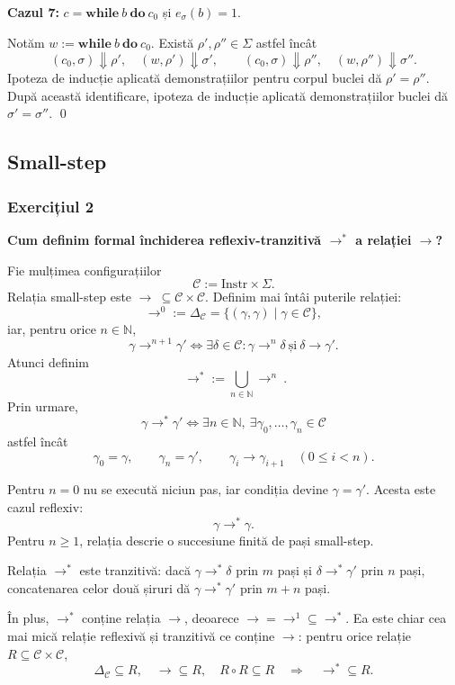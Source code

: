 \textbf{Cazul 7:} $c=\mathbf{while}\ b\ \mathbf{do}\ c_0$ și
$e_\sigma(b)=1$.

Notăm $w:=\mathbf{while}\ b\ \mathbf{do}\ c_0$. Există
$\rho',\rho''\in\Sigma$ astfel încât
\[
	(c_0,\sigma)\Downarrow\rho',
	\quad (w,\rho')\Downarrow\sigma',
	\qquad
	(c_0,\sigma)\Downarrow\rho'',
	\quad (w,\rho'')\Downarrow\sigma''.
\]
Ipoteza de inducție aplicată demonstrațiilor pentru corpul buclei dă
$\rho'=\rho''$. După această identificare, ipoteza de inducție aplicată
demonstrațiilor buclei dă $\sigma'=\sigma''$. \qed

\subsection{Small-step}

\subsubsection{Exercițiul 2}

\textbf{Cum definim formal închiderea reflexiv-tranzitivă
	$\to^*$ a relației $\to$?}

Fie mulțimea configurațiilor
\[
	\mathcal C:=\mathrm{Instr}\times\Sigma.
\]
Relația small-step este $\to\ \subseteq\mathcal C\times\mathcal C$.
Definim mai întâi puterile relației:
\[
	\to^0:=\Delta_{\mathcal C}
	=\{(\gamma,\gamma)\mid\gamma\in\mathcal C\},
\]
iar, pentru orice $n\in\mathbb N$,
\[
	\gamma\to^{n+1}\gamma'
	\iff
	\exists\delta\in\mathcal C:
	\gamma\to^n\delta\ \text{și}\ \delta\to\gamma'.
\]
Atunci definim
\[
	\boxed{\ \to^*:=\bigcup_{n\in\mathbb N}\to^n\ }.
\]
Prin urmare,
\[
	\gamma\to^*\gamma'
	\iff
	\exists n\in\mathbb N,\ \exists\gamma_0,\ldots,\gamma_n\in\mathcal C
\]
astfel încât
\[
	\gamma_0=\gamma,\qquad
	\gamma_n=\gamma',\qquad
	\gamma_i\to\gamma_{i+1}
	\quad(0\leq i<n).
\]

Pentru $n=0$ nu se execută niciun pas, iar condiția devine
$\gamma=\gamma'$. Acesta este cazul reflexiv:
\[
	\gamma\to^*\gamma.
\]
Pentru $n\geq1$, relația descrie o succesiune finită de pași
small-step.

Relația $\to^*$ este tranzitivă: dacă $\gamma\to^*\delta$ prin $m$ pași
și $\delta\to^*\gamma'$ prin $n$ pași, concatenarea celor două șiruri
dă $\gamma\to^*\gamma'$ prin $m+n$ pași.

În plus, $\to^*$ conține relația $\to$, deoarece
$\to=\to^1\subseteq\to^*$. Ea este chiar cea mai mică relație
reflexivă și tranzitivă ce conține $\to$: pentru orice relație
$R\subseteq\mathcal C\times\mathcal C$,
\[
	\Delta_{\mathcal C}\subseteq R,\quad
	{\to}\subseteq R,\quad
	R\circ R\subseteq R
	\quad\Longrightarrow\quad
	{\to^*}\subseteq R.
\]

